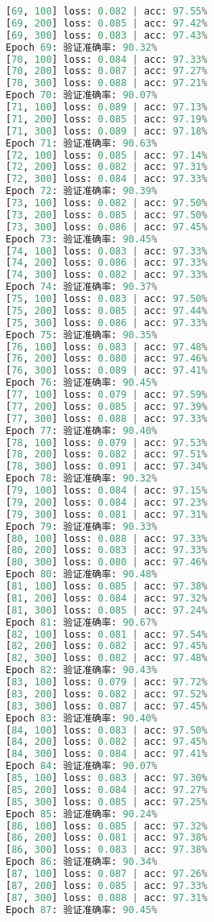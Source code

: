 \documentclass[UTF8]{report}
\theoremstyle{MyLineTheoremStyle} %
\theoremstyle{MyBlockTheoremStyle} %
\theoremstyle{MySubsubsectionStyle} %
\begin{document}
\begin{lstlisting}[language=python, caption={CNN训练结果一}, label={lst:cnn_train_result}]
[69, 100] loss: 0.082 | acc: 97.55%
[69, 200] loss: 0.085 | acc: 97.42%
[69, 300] loss: 0.083 | acc: 97.43%
Epoch 69: 验证准确率: 90.32%
[70, 100] loss: 0.084 | acc: 97.33%
[70, 200] loss: 0.087 | acc: 97.27%
[70, 300] loss: 0.088 | acc: 97.21%
Epoch 70: 验证准确率: 90.07%
[71, 100] loss: 0.089 | acc: 97.13%
[71, 200] loss: 0.085 | acc: 97.19%
[71, 300] loss: 0.089 | acc: 97.18%
Epoch 71: 验证准确率: 90.63%
[72, 100] loss: 0.085 | acc: 97.14%
[72, 200] loss: 0.082 | acc: 97.31%
[72, 300] loss: 0.084 | acc: 97.33%
Epoch 72: 验证准确率: 90.39%
[73, 100] loss: 0.082 | acc: 97.50%
[73, 200] loss: 0.085 | acc: 97.50%
[73, 300] loss: 0.086 | acc: 97.45%
Epoch 73: 验证准确率: 90.45%
[74, 100] loss: 0.083 | acc: 97.33%
[74, 200] loss: 0.086 | acc: 97.33%
[74, 300] loss: 0.082 | acc: 97.33%
Epoch 74: 验证准确率: 90.37%
[75, 100] loss: 0.083 | acc: 97.50%
[75, 200] loss: 0.085 | acc: 97.44%
[75, 300] loss: 0.086 | acc: 97.33%
Epoch 75: 验证准确率: 90.35%
[76, 100] loss: 0.083 | acc: 97.48%
[76, 200] loss: 0.080 | acc: 97.46%
[76, 300] loss: 0.089 | acc: 97.41%
Epoch 76: 验证准确率: 90.45%
[77, 100] loss: 0.079 | acc: 97.59%
[77, 200] loss: 0.085 | acc: 97.39%
[77, 300] loss: 0.088 | acc: 97.33%
Epoch 77: 验证准确率: 90.40%
[78, 100] loss: 0.079 | acc: 97.53%
[78, 200] loss: 0.082 | acc: 97.51%
[78, 300] loss: 0.091 | acc: 97.34%
Epoch 78: 验证准确率: 90.32%
[79, 100] loss: 0.084 | acc: 97.15%
[79, 200] loss: 0.084 | acc: 97.23%
[79, 300] loss: 0.081 | acc: 97.31%
Epoch 79: 验证准确率: 90.33%
[80, 100] loss: 0.088 | acc: 97.33%
[80, 200] loss: 0.083 | acc: 97.33%
[80, 300] loss: 0.080 | acc: 97.46%
Epoch 80: 验证准确率: 90.48%
[81, 100] loss: 0.085 | acc: 97.38%
[81, 200] loss: 0.084 | acc: 97.32%
[81, 300] loss: 0.085 | acc: 97.24%
Epoch 81: 验证准确率: 90.67%
[82, 100] loss: 0.081 | acc: 97.54%
[82, 200] loss: 0.082 | acc: 97.45%
[82, 300] loss: 0.082 | acc: 97.48%
Epoch 82: 验证准确率: 90.43%
[83, 100] loss: 0.079 | acc: 97.72%
[83, 200] loss: 0.082 | acc: 97.52%
[83, 300] loss: 0.087 | acc: 97.45%
Epoch 83: 验证准确率: 90.40%
[84, 100] loss: 0.083 | acc: 97.50%
[84, 200] loss: 0.082 | acc: 97.45%
[84, 300] loss: 0.084 | acc: 97.41%
Epoch 84: 验证准确率: 90.07%
[85, 100] loss: 0.083 | acc: 97.30%
[85, 200] loss: 0.084 | acc: 97.27%
[85, 300] loss: 0.085 | acc: 97.25%
Epoch 85: 验证准确率: 90.24%
[86, 100] loss: 0.085 | acc: 97.32%
[86, 200] loss: 0.081 | acc: 97.38%
[86, 300] loss: 0.083 | acc: 97.38%
Epoch 86: 验证准确率: 90.34%
[87, 100] loss: 0.087 | acc: 97.26%
[87, 200] loss: 0.085 | acc: 97.33%
[87, 300] loss: 0.088 | acc: 97.31%
Epoch 87: 验证准确率: 90.45%

\end{lstlisting}
\end{document}
